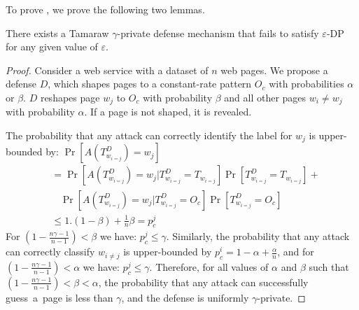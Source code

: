 {To prove , we prove the following two lemmas.
\begin{lemma}
  There exists a Tamaraw $\gamma$-private defense mechanism that fails to
  satisfy $\varepsilon$-DP for any given value of $\varepsilon$.
\end{lemma}
\begin{proof}
Consider a web service with a dataset of $n$ web pages.
We propose a defense $D$, which shapes pages to a constant-rate pattern $O_c$
with probabilities $\alpha$ or $\beta$.
$D$ reshapes page $w_j$ to $O_c$ with probability $\beta$ and
all other pages $w_i \neq w_j$ with probability $\alpha$.
If a page is not shaped, it is revealed.


The probability that any attack can correctly identify the label for $w_j$ is
upper-bounded by:  $\Pr[A(T^{D}_{w_{i=j}}) = w_j]$
\begin{align*}
  & = \Pr[A(T^D_{w_{i=j}}) = w_j |
  T^D_{w_{i=j}}=T_{w_{i=j}}]\Pr[T^D_{w_{i=j}}=T_{w_{i=j}}] +
  \\
  &~~~~\Pr[A(T^D_{w_{i=j}}) = w_j | T^D_{w_{i=j}}=O_c]\Pr[T^D_{w_{i=j}}=O_c]
  \\
  & \leq  1.(1-\beta) + \frac{1}{n}\beta = p_c^j
\end{align*}
For $(1- \frac{n\gamma - 1}{n-1}) < \beta$ we have: $p_c^j \leq \gamma$.
%
Similarly, the probability that any attack can correctly classify $w_{i\neq j}$
is upper-bounded by $p_c^i = 1-\alpha + \frac{\alpha}{n}$, and for $(1-
\frac{n\gamma - 1}{n-1}) < \alpha$ we have: $p_c^j \leq \gamma$.
Therefore, for all values of $\alpha$ and $\beta$ such that $(1- \frac{n\gamma -
1}{n-1}) < \beta < \alpha$, the probability that any attack can successfully
guess~a~page is less than $\gamma$, and
the defense is uniformly $\gamma$-private.


\end{proof}}
